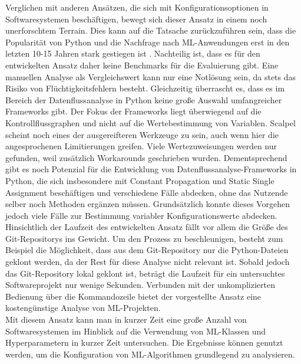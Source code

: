 \documentclass[german,bachelor]{swsLeipzig}
\begin{document}
\indent Verglichen mit anderen Ansätzen, die sich mit Konfigurationsoptionen in Softwaresystemen beschäftigen, bewegt sich
dieser Ansatz in einem noch unerforschtem Terrain.
Dies kann auf die Tatsache zurückzuführen sein, dass die Popularität von Python und die Nachfrage nach ML-Anwendungen erst
in den letzten 10-15 Jahren stark gestiegen ist \cite[]{srinath2017python}.
Nachteilig ist, dass es für den entwickelten Ansatz daher keine Benchmarks für die Evaluierung gibt.
Eine manuellen Analyse als Vergleichswert kann nur eine Notlösung sein, da stets das Risiko von Flüchtigkeitsfehlern besteht.
Gleichzeitig überrascht es, dass es im Bereich der Datenflussanalyse in Python keine große Auswahl umfangreicher Frameworks
gibt.
Der Fokus der Frameworks liegt überwiegend auf die Kontrollflussgraphen und nicht auf die Wertebestimmung von Variablen.
Scalpel scheint noch eines der ausgereifteren Werkzeuge zu sein, auch wenn hier die angesprochenen
Limitierungen greifen.
Viele Wertezuweisungen werden nur gefunden, weil zusätzlich Workarounds geschrieben wurden.
Dementsprechend gibt es noch Potenzial für die Entwicklung von Datenflussanalyse-Frameworks in Python, die sich
insbesondere mit Constant Propagation und Static Single Assignment beschäftigen und verschiedene Fälle abdecken, ohne das
Nutzende selber noch Methoden ergänzen müssen.
Grundsätzlich konnte dieses Vorgehen jedoch viele Fälle zur Bestimmung variabler Konfigurationswerte abdecken.\\
\indent Hinsichtlich der Laufzeit des entwickelten Ansatz fällt vor allem die Größe des Git-Repositorys ins Gewicht.
Um den Prozess zu beschleunigen, besteht zum Beispiel die Möglichkeit, dass aus dem Git-Repository nur die Python-Dateien
geklont werden, da der Rest für diese Analyse nicht relevant ist.
Sobald jedoch das Git-Repository lokal geklont ist, beträgt die Laufzeit für ein untersuchtes Softwareprojekt nur wenige Sekunden.
Verbunden mit der unkomplizierten Bedienung über die Kommandozeile bietet der vorgestellte Ansatz eine kostengünstige Analyse
von ML-Projekten.\\
\indent Mit diesem Ansatz kann man in kurzer Zeit eine große Anzahl von Softwaresystemen im Hinblick auf die Verwendung von
ML-Klassen und Hyperparametern in kurzer Zeit untersuchen.
Die Ergebnisse können genutzt werden, um die Konfiguration von ML-Algorithmen grundlegend zu analysieren.


\end{document}
